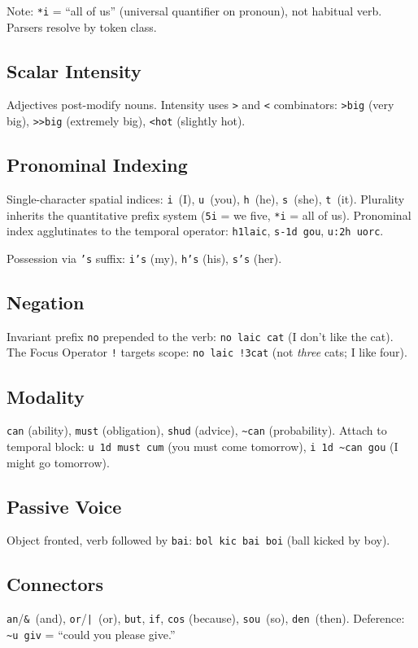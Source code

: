 \documentclass[12pt,onecolumn,letterpaper]{article}
\newcommand{\me}[1]{\texttt{#1}}
\begin{document}
Note: \me{*i} = ``all of us'' (universal quantifier on pronoun), not
habitual verb. Parsers resolve by token class.

\subsection{Scalar Intensity}
Adjectives post-modify nouns. Intensity uses \me{>} and \me{<} combinators:
\me{>big} (very big), \me{>>big} (extremely big), \me{<hot} (slightly hot).

\subsection{Pronominal Indexing}
Single-character spatial indices: \me{i}~(I), \me{u}~(you), \me{h}~(he),
\me{s}~(she), \me{t}~(it). Plurality inherits the quantitative prefix system
(\me{5i} = we five, \me{*i} = all of us). Pronominal index agglutinates to
the temporal operator: \me{h1laic}, \me{s-1d gou}, \me{u:2h uorc}.

Possession via \me{'s} suffix: \me{i's} (my), \me{h's} (his), \me{s's} (her).

\subsection{Negation}
Invariant prefix \me{no} prepended to the verb: \me{no laic cat} (I don't
like the cat). The Focus Operator \me{!} targets scope: \me{no laic !3cat}
(not \textit{three} cats; I like four).

\subsection{Modality}
\me{can} (ability), \me{must} (obligation), \me{shud} (advice),
\me{\~{}can} (probability). Attach to temporal block: \me{u 1d must cum}
(you must come tomorrow), \me{i 1d \~{}can gou} (I might go tomorrow).

\subsection{Passive Voice}
Object fronted, verb followed by \me{bai}: \me{bol kic bai boi} (ball
kicked by boy).

\subsection{Connectors}
\me{an}/\me{\&}~(and), \me{or}/\me{|}~(or), \me{but}, \me{if}, \me{cos}
(because), \me{sou}~(so), \me{den}~(then). Deference: \me{\~{}u giv}
= ``could you please give.''
\end{document}
